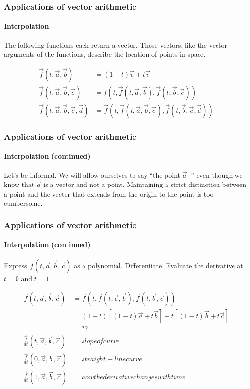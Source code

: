 \documentclass[xcolor=dvipsnames]{beamer}
\begin{document}
\begin{frame}
\frametitle{Applications of vector arithmetic}
\framesubtitle{Interpolation}

  The following functions each return a vector.
  Those vectors, like the vector arguments of the
  functions, describe the location of points in space.

  \begin{align*}
    \vec{f}(t, \vec{a}, \vec{b}) & = (1 - t) \vec{u} + t \vec{v} \\
    \vec{f}(t, \vec{a}, \vec{b}, \vec{c}) & = 
      f( t, \vec{f}(t, \vec{a}, \vec{b}), \vec{f}(t, \vec{b}, \vec{c})) \\
    \vec{f}(t, \vec{a}, \vec{b}, \vec{c}, \vec{d}) & =
      \vec{f}(t, \vec{f}(t, \vec{a}, \vec{b}, \vec{c}),
           \vec{f}(t, \vec{b}, \vec{c}, \vec{d}))
    \end{align*}
  \end{frame}

\begin{frame}
\frametitle{Applications of vector arithmetic}
\framesubtitle{Interpolation (continued)}
  
  Let's be informal.
  We will allow ourselves to say  ``the point $\vec{a}\;\;$''
  even though we know that $\vec{a}$ is a vector and not a point.
  Maintaining a strict distinction between a point and the
  vector that extends from the origin to the point is too 
  cumbersome.

  \end{frame}

\begin{frame}
\frametitle{Applications of vector arithmetic}
\framesubtitle{Interpolation (continued)}

  Express $\vec{f}(t, \vec{a}, \vec{b}, \vec{c})$ as 
  a polynomial. Differentiate. Evaluate the derivative
  at $t = 0$ and $t = 1$.

  \begin{align*}
    \vec{f}(t, \vec{a}, \vec{b}, \vec{c}) & = 
      \vec{f}( t, 
        \vec{f}(t, \vec{a}, \vec{b}), 
        \vec{f}(t, \vec{b}, \vec{c})) \\
      & = (1 - t) [(1 - t) \vec{a} + t \vec{b}] + 
        t [(1 - t) \vec{b} + t \vec{c}] \\
      & = ?? \\
    \frac{\vec{f}}{dt}( t , \vec{a}, \vec{b}, \vec{c}) & = slope of curve \\
    \frac{\vec{f}}{dt}( 0 , \vec{a}, \vec{b}, \vec{c}) & = straight-line curve \\
    \frac{\vec{f}}{dt}( 1 , \vec{a}, \vec{b}, \vec{c}) & = how the derivative changes with time \\
    \end{align*}

  \end{frame}
\end{document}
